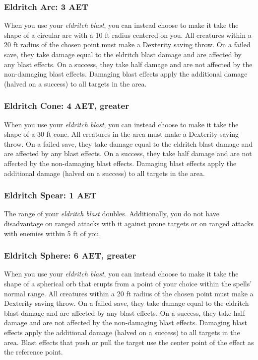 \subsubsection{Eldritch Arc: 3 AET}
When you use your \textit{eldritch blast}, you can instead choose to make it take the shape of a circular arc with a 10 ft radius centered on you. All creatures within a 20 ft radius of the chosen point must make a Dexterity saving throw. On a failed save, they take damage equal to the eldritch blast damage and are affected by any blast effects. On a success, they take half damage and are not affected by the non-damaging blast effects. Damaging blast effects apply the additional damage (halved on a success) to all targets in the area.

\subsubsection{Eldritch Cone: 4 AET, greater}
When you use your \textit{eldritch blast}, you can instead choose to make it take the shape of a 30 ft cone. All creatures in the area must make a Dexterity saving throw. On a failed save, they take damage equal to the eldritch blast damage and are affected by any blast effects. On a success, they take half damage and are not affected by the non-damaging blast effects. Damaging blast effects apply the additional damage (halved on a success) to all targets in the area.

\subsubsection{Eldritch Spear: 1 AET}
The range of your \textit{eldritch blast} doubles. Additionally, you do not have disadvantage on ranged attacks with it against prone targets or on ranged attacks with enemies within 5 ft of you.

\subsubsection{Eldritch Sphere: 6 AET, greater}
When you use your \textit{eldritch blast}, you can instead choose to make it take the shape of a spherical orb that erupts from a point of your choice within the spells' normal range. All creatures within a 20 ft radius of the chosen point must make a Dexterity saving throw. On a failed save, they take damage equal to the eldritch blast damage and are affected by any blast effects. On a success, they take half damage and are not affected by the non-damaging blast effects. Damaging blast effects apply the additional damage (halved on a success) to all targets in the area. Blast effects that push or pull the target use the center point of the effect as the reference point.

